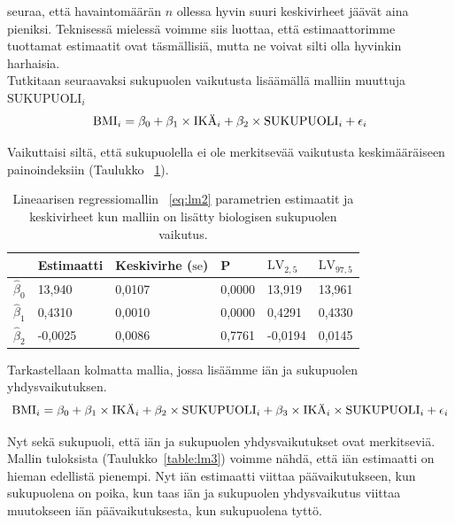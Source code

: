 \documentclass[finnish]{docopts}
\begin{document}
seuraa, että havaintomäärän $n$ ollessa hyvin suuri keskivirheet jäävät aina pieniksi. Teknisessä mielessä voimme siis luottaa, että estimaattorimme tuottamat estimaatit ovat täsmällisiä, mutta ne voivat silti olla hyvinkin harhaisia.\\

Tutkitaan seuraavaksi sukupuolen vaikutusta lisäämällä malliin muuttuja $\text{SUKUPUOLI}_i$\\

\begin{equation}
\text{BMI}_i = \beta_0 + \beta_1 \times \text{IKÄ}_i + \beta_2 \times \text{SUKUPUOLI}_i + \epsilon_i \label{eq:lm2}\\
\end{equation}

Vaikuttaisi siltä, että sukupuolella ei ole merkitsevää vaikutusta keskimääräiseen painoindeksiin (Taulukko ~\ref{table:lm2}).\\

\begin{table}[H]
\centering
\begin{tabular}{llllll}
\toprule
  & Estimaatti & Keskivirhe ($\text{se}$) & P & $\text{LV}_{2,5}$ & $\text{LV}_{97,5}$\\
\midrule
$\hat{\beta}_0$ & 13,940 & 0,0107 & 0,0000 & 13,919 & 13,961\\
$\hat{\beta}_1$ & 0,4310 & 0,0010 & 0,0000 & 0,4291 & 0,4330\\
$\hat{\beta}_2$ & -0,0025 & 0,0086 & 0,7761 & -0,0194 & 0,0145\\
\bottomrule
\end{tabular}
\caption{Lineaarisen regressiomallin ~\ref{eq:lm2} parametrien estimaatit ja keskivirheet kun malliin on lisätty biologisen sukupuolen vaikutus.}
\label{table:lm2}
\end{table}

Tarkastellaan kolmatta mallia, jossa lisäämme iän ja sukupuolen yhdysvaikutuksen.\\

\begin{equation}
\text{BMI}_i = \beta_0 + \beta_1 \times \text{IKÄ}_i + \beta_2 \times \text{SUKUPUOLI}_i + \beta_3 \times \text{IKÄ}_i \times \text{SUKUPUOLI}_i + \epsilon_i \label{eq:lm3}\\
\end{equation}

Nyt sekä sukupuoli, että iän ja sukupuolen yhdysvaikutukset ovat merkitseviä. Mallin tuloksista (Taulukko~\ref{table:lm3}) voimme nähdä, että iän estimaatti on hieman edellistä pienempi. Nyt iän estimaatti viittaa päävaikutukseen, kun sukupuolena on poika, kun taas iän ja sukupuolen yhdysvaikutus viittaa muutokseen iän päävaikutuksesta, kun sukupuolena tyttö.\\
\end{document}

